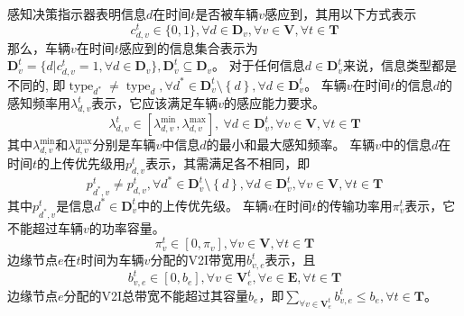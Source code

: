 感知决策指示器表明信息$d$在时间$t$是否被车辆$v$感应到，其用以下方式表示
\begin{equation}
	c_{d, v}^t \in \{0, 1\}, \forall d \in \mathbf{D}_{v}, \forall v \in \mathbf{V}, \forall t \in \mathbf{T}
	\label{equ 5-1} 
\end{equation}
那么，车辆$v$在时间$t$感应到的信息集合表示为 $\mathbf{D}_v^t = \{ d | c_{d, v}^{t} = 1, \forall d \in \mathbf{D}_v \}, \mathbf{D}_v^t \subseteq \mathbf{D}_v$。
对于任何信息$d \in \mathbf{D}_v^t$来说，信息类型都是不同的, 即$\operatorname{type}_{d^*} \neq \operatorname{type}_{d}, \forall d^* \in \mathbf{D}_v^t \setminus \left\{ d\right \}, \forall d \in \mathbf{D}_v^t$。
车辆$v$在时间$t$的信息$d$的感知频率用$\lambda_{d, v}^t$表示，它应该满足车辆$v$的感应能力要求。
\begin{equation}
	\lambda_{d, v}^{t} \in [\lambda_{d, v}^{\min} , \lambda_{d, v}^{\max} ], \ \forall d \in \mathbf{D}_v^t, \forall v \in \mathbf{V}, \forall t \in \mathbf{T}
\end{equation}
其中$\lambda_{d, v}^{\min}$和$\lambda_{d, v}^{\max}$分别是车辆$v$中信息${d}$的最小和最大感知频率。
车辆$v$中的信息$d$在时间$t$的上传优先级用$p_{d, v}^t$表示，其需满足各不相同，即
\begin{equation}
	{p}_{d^*, v}^t \neq {p}_{d, v}^t, \forall d^* \in \mathbf{D}_v^t \setminus \left\{ d\right \}, \forall d \in \mathbf{D}_v^t, \forall v \in \mathbf{V}, \forall t \in \mathbf{T}
\end{equation}
其中${p}_{d^*, v}^t$是信息$d^* \in \mathbf{D}_v^t$中的上传优先级。
车辆$v$在时间$t$的传输功率用$\pi_{v}^t$表示，它不能超过车辆$v$的功率容量。
\begin{equation}
	\pi_v^t \in \left[ 0 , \pi_v \right ], \forall v \in \mathbf{V}, \forall t \in \mathbf{T}
\end{equation}
边缘节点$e$在$t$时间为车辆$v$分配的V2I带宽用$b_{v, e}^t$表示，且 
\begin{equation}
	b_{v, e}^t \in \left [0, b_e \right], \forall v \in \mathbf{V}_e^{t}, \forall e \in \mathbf{E}, \forall t \in \mathbf{T}
	\label{equ 5-5} 
\end{equation}
边缘节点$e$分配的V2I总带宽不能超过其容量$b_e$，即${\sum_{\forall v \in \mathbf{V}_e^{t}} b_{v, e}^t} \leq b_e, \forall t \in \mathbf{T}$。

